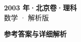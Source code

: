 \documentclass[zihao=-4, a4paper]{ctexart}
\begin{document}
\begin{center}
  {\Large\bfseries 2003 年·北京卷·理科}\\[4pt]
  {\large 数学 · 解析版}
\end{center}
\medskip
{}

\clearpage
{}
\begin{center}{\Large\bfseries 参考答案与详细解析}\end{center}
\medskip

\end{document}
